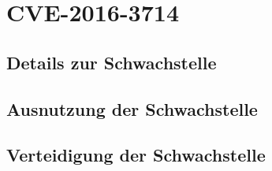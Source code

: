 \chapter{CVE-2016-3714}\label{ch:cve}

\section{Details zur Schwachstelle}\label{sec:details-zur-schwachstelle}




%
%
\section{Ausnutzung der Schwachstelle}\label{sec:ausnutzung-der-schwachstelle}













%

\section{Verteidigung der Schwachstelle}\label{sec:verteidigung-der-schwachstelle}


